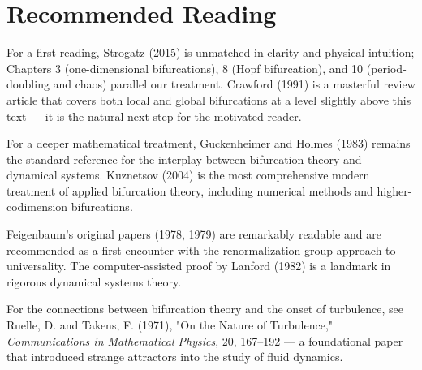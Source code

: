 \section*{Recommended Reading}

For a first reading, Strogatz (2015) is unmatched in clarity and physical intuition; Chapters 3 (one-dimensional bifurcations), 8 (Hopf bifurcation), and 10 (period-doubling and chaos) parallel our treatment. Crawford (1991) is a masterful review article that covers both local and global bifurcations at a level slightly above this text --- it is the natural next step for the motivated reader.

For a deeper mathematical treatment, Guckenheimer and Holmes (1983) remains the standard reference for the interplay between bifurcation theory and dynamical systems. Kuznetsov (2004) is the most comprehensive modern treatment of applied bifurcation theory, including numerical methods and higher-codimension bifurcations.

Feigenbaum's original papers (1978, 1979) are remarkably readable and are recommended as a first encounter with the renormalization group approach to universality. The computer-assisted proof by Lanford (1982) is a landmark in rigorous dynamical systems theory.

For the connections between bifurcation theory and the onset of turbulence, see Ruelle, D. and Takens, F. (1971), "On the Nature of Turbulence," \textit{Communications in Mathematical Physics}, 20, 167--192 --- a foundational paper that introduced strange attractors into the study of fluid dynamics.
